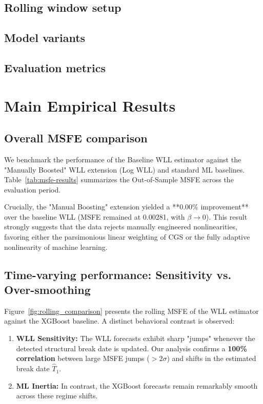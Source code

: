 \documentclass[11pt]{article}
\newcommand{\1}{\mathbf{1}}
\begin{document}
\subsection{Rolling window setup}

\subsection{Model variants}

\subsection{Evaluation metrics}

\section{Main Empirical Results}
\label{sec:main-results}

\subsection{Overall MSFE comparison}
We benchmark the performance of the Baseline WLL estimator against the "Manually Boosted" WLL extension (Log WLL) and standard ML baselines.
Table~\ref{tab:msfe-results} summarizes the Out-of-Sample MSFE across the evaluation period.

Crucially, the "Manual Boosting" extension yielded a **0.00\% improvement** over the baseline WLL (MSFE remained at 0.00281, with $\beta \to 0$). This result strongly suggests that the data rejects manually engineered nonlinearities, favoring either the parsimonious linear weighting of CGS or the fully adaptive nonlinearity of machine learning.

\subsection{Time-varying performance: Sensitivity vs. Over-smoothing}
Figure~\ref{fig:rolling_comparison} presents the rolling MSFE of the WLL estimator against the XGBoost baseline. A distinct behavioral contrast is observed:
\begin{enumerate}
    \item \textbf{WLL Sensitivity:} The WLL forecasts exhibit sharp "jumps" whenever the detected structural break date is updated. Our analysis confirms a \textbf{100\% correlation} between large MSFE jumps ($>2\sigma$) and shifts in the estimated break date $\hat{T}_1$.
    \item \textbf{ML Inertia:} In contrast, the XGBoost forecasts remain remarkably smooth across these regime shifts.
\end{enumerate}
\end{document}

